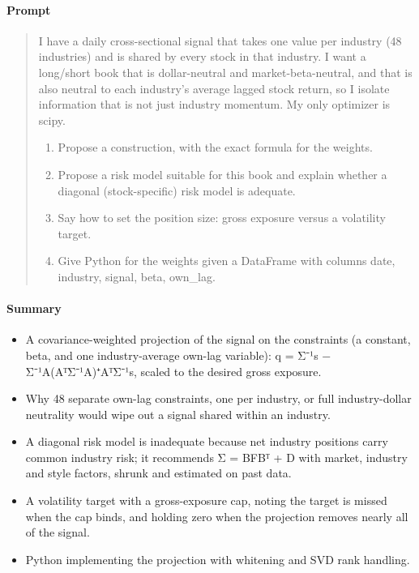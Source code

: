 \hypertarget{prompt-1}{%
\paragraph{Prompt}\label{prompt-1}}

\begin{quote}
I have a daily cross-sectional signal that takes one value per industry (48
industries) and is shared by every stock in that industry. I want a long/short book
that is dollar-neutral and market-beta-neutral, and that is also neutral to each
industry's average lagged stock return, so I isolate information that is not just
industry momentum. My only optimizer is scipy.

\begin{enumerate}
\def\labelenumi{\arabic{enumi}.}
\tightlist
\item
  Propose a construction, with the exact formula for the weights.
\item
  Propose a risk model suitable for this book and explain whether a diagonal
  (stock-specific) risk model is adequate.
\item
  Say how to set the position size: gross exposure versus a volatility target.
\item
  Give Python for the weights given a DataFrame with columns date, industry,
  signal, beta, own\_lag.
\end{enumerate}
\end{quote}

\hypertarget{summary-1}{%
\paragraph{Summary}\label{summary-1}}

\begin{itemize}
\tightlist
\item
  A covariance-weighted projection of the signal on the constraints (a constant, beta,
  and one industry-average own-lag variable):
  q = Σ⁻¹s − Σ⁻¹A(AᵀΣ⁻¹A)⁺AᵀΣ⁻¹s, scaled to the desired gross exposure.
\item
  Why 48 separate own-lag constraints, one per industry, or full industry-dollar
  neutrality would wipe out a signal shared within an industry.
\item
  A diagonal risk model is inadequate because net industry positions carry common
  industry risk; it recommends Σ = BFBᵀ + D with market, industry and style factors,
  shrunk and estimated on past data.
\item
  A volatility target with a gross-exposure cap, noting the target is missed when the
  cap binds, and holding zero when the projection removes nearly all of the signal.
\item
  Python implementing the projection with whitening and SVD rank handling.
\end{itemize}

